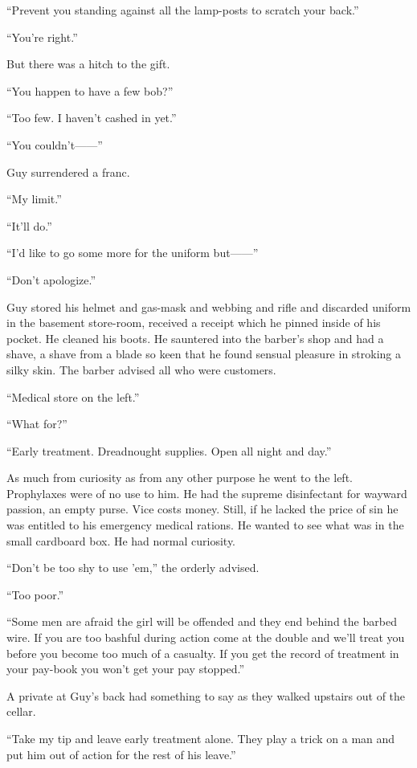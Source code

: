 ``Prevent you standing against all the lamp-posts to scratch your back.''

``You're right.''

But there was a hitch to the gift.

``You happen to have a few bob?''

``Too few. I haven't cashed in yet.''

``You couldn't------''

Guy surrendered a franc.

``My limit.''

``It'll do.''

``I'd like to go some more for the uniform but------''

``Don't apologize.''

Guy stored his helmet and gas-mask and webbing and rifle and discarded uniform in the basement store-room, received a receipt which he pinned inside of his pocket. He cleaned his boots. He sauntered into the barber's shop and had a shave, a shave from a blade so keen that he found sensual pleasure in stroking a silky skin. The barber advised all who were customers.

``Medical store on the left.''

``What for?''

``Early treatment. Dreadnought supplies. Open all night and day.''

As much from curiosity as from any other purpose he went to the left. Prophylaxes were of no use to him. He had the supreme disinfectant for wayward passion, an empty purse. Vice costs money. Still, if he lacked the price of sin he was entitled to his emergency medical rations. He wanted to see what was in the small cardboard box. He had normal curiosity.

``Don't be too shy to use 'em,'' the orderly advised.

``Too poor.''

``Some men are afraid the girl will be offended and they end behind the barbed wire. If you are too bashful during action come at the double and we'll treat you before you become too much of a casualty. If you get the record of treatment in your pay-book you won't get your pay stopped.''

A private at Guy's back had something to say as they walked upstairs out of the cellar.

``Take my tip and leave early treatment alone. They play a trick on a man and put him out of action for the rest of his leave.''

